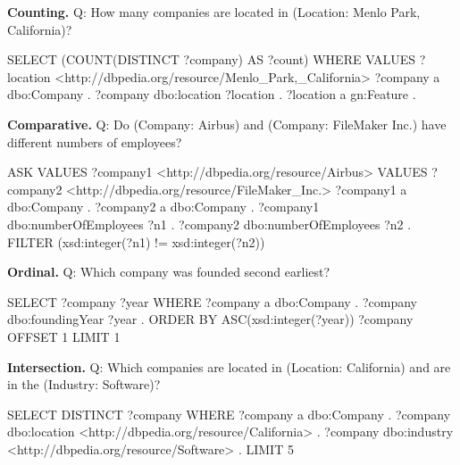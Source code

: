 \documentclass[11pt]{article}
\begin{document}
\noindent\textbf{Counting.} Q: How many companies are located in (Location: Menlo Park, California)?
\begin{SPARQL}
SELECT (COUNT(DISTINCT ?company) AS ?count)
WHERE {
  VALUES ?location { <http://dbpedia.org/resource/Menlo_Park,_California> }
  ?company a dbo:Company .
  ?company dbo:location ?location .
  ?location a gn:Feature .
}
\end{SPARQL}

\noindent\textbf{Comparative.} Q: Do (Company: Airbus) and (Company: FileMaker Inc.) have different numbers of employees?
\begin{SPARQL}
ASK {
  VALUES ?company1 { <http://dbpedia.org/resource/Airbus> }
  VALUES ?company2 { <http://dbpedia.org/resource/FileMaker_Inc.> }
  ?company1 a dbo:Company .
  ?company2 a dbo:Company .
  ?company1 dbo:numberOfEmployees ?n1 .
  ?company2 dbo:numberOfEmployees ?n2 .
  FILTER (xsd:integer(?n1) != xsd:integer(?n2))
}
\end{SPARQL}

\noindent\textbf{Ordinal.} Q: Which company was founded second earliest?
\begin{SPARQL}
SELECT ?company ?year
WHERE {
  ?company a dbo:Company .
  ?company dbo:foundingYear ?year .
}
ORDER BY ASC(xsd:integer(?year)) ?company
OFFSET 1
LIMIT 1
\end{SPARQL}

\noindent\textbf{Intersection.} Q: Which companies are located in (Location: California) and are in the (Industry: Software)?
\begin{SPARQL}
SELECT DISTINCT ?company
WHERE {
  ?company a dbo:Company .
  ?company dbo:location <http://dbpedia.org/resource/California> .
  ?company dbo:industry <http://dbpedia.org/resource/Software> .
}
LIMIT 5
\end{SPARQL}
\end{document}
